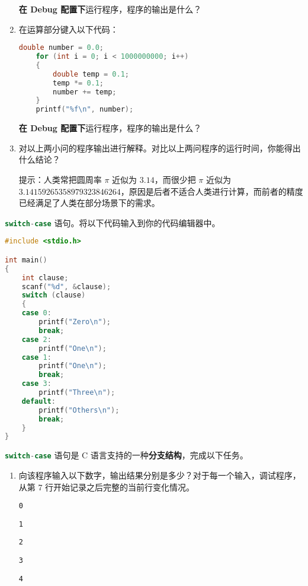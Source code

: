 \begin{problemset}
\begin{enumerate}
		\textbf{在 Debug 配置下}运行程序，程序的输出是什么？

		\item 在运算部分键入以下代码：

		\begin{lstlisting}[language=c, firstnumber=11]
	double number = 0.0;
	for (int i = 0; i < 1000000000; i++)
	{
		double temp = 0.1;
		temp *= 0.1;
		number += temp;
	}
	printf("%f\n", number);
		\end{lstlisting}

		\textbf{在 Debug 配置下}运行程序，程序的输出是什么？

		\item 对以上两小问的程序输出进行解释。对比以上两问程序的运行时间，你能得出什么结论？

		提示：人类常把圆周率 $\pi$ 近似为 $3.14$，而很少把 $\pi$ 近似为 $3.14159265358979323846264$，原因是后者不适合人类进行计算，而前者的精度已经满足了人类在部分场景下的需求。
	\end{enumerate}

	\item \lstinline[language=c]{switch-case} 语句。将以下代码输入到你的代码编辑器中。

	\begin{lstlisting}[language=c]
#include <stdio.h>

int main()
{
	int clause;
	scanf("%d", &clause);
	switch (clause)
	{
	case 0:
		printf("Zero\n");
		break;
	case 2:
		printf("One\n");
	case 1:
		printf("One\n");
		break;
	case 3:
		printf("Three\n");
	default:
		printf("Others\n");
		break;
	}
}
	\end{lstlisting}

	\lstinline[language=c]{switch-case} 语句是 C 语言支持的一种\textbf{分支结构}，完成以下任务。

	\begin{enumerate}
		\item 向该程序输入以下数字，输出结果分别是多少？对于每一个输入，调试程序，从第 7 行开始记录之后完整的当前行变化情况。
		\begin{lstlisting}[numbers=none]
0
		\end{lstlisting}
		\begin{lstlisting}[numbers=none]
1
		\end{lstlisting}
		\begin{lstlisting}[numbers=none]
2
		\end{lstlisting}
		\begin{lstlisting}[numbers=none]
3
		\end{lstlisting}
		\begin{lstlisting}[numbers=none]
4
		\end{lstlisting}


\end{enumerate}
\end{problemset}
